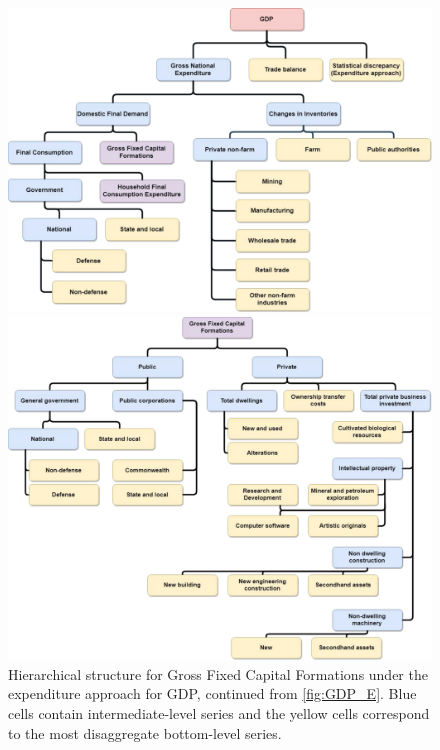 \documentclass[graybox]{svmult}
\begin{document}
\begin{figure}
	\centering	\includegraphics[width=.9\textwidth]{Figs/Hierarchical-structures/ExpenditureApproach.pdf}
	\caption{Hierarchical structure of the expenditure approach for GDP\@. The pink cell contains GDP, the most aggregate series. The blue and purple cells contain intermediate-level series with the series in the purple cells further disaggregated in Figures~\ref{fig:GFCF} and~\ref{fig:HFCE}. The yellow cells contain the most disaggregate bottom-level series.}\label{fig:GDP_E}
	\centering
	\includegraphics[width=.9\textwidth]{Figs/Hierarchical-structures/GFCF.pdf}
	\caption{Hierarchical structure for Gross Fixed Capital Formations under the expenditure approach for GDP, continued from \autoref{fig:GDP_E}. Blue cells contain intermediate-level series and the yellow cells correspond to the most disaggregate bottom-level series.}\label{fig:GFCF}
\end{figure}
\end{document}
